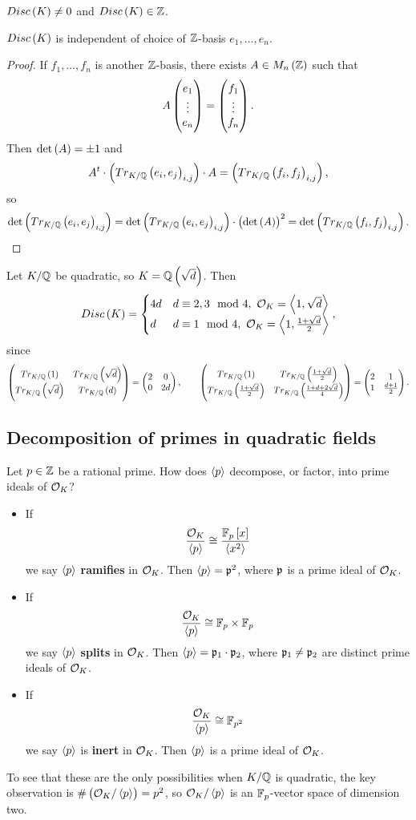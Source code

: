 \begin{remark*}
$ Disc\br{K} \ne 0 $ and $ Disc\br{K} \in \Z $.
\end{remark*}

\begin{lemma}
$ Disc\br{K} $ is independent of choice of $ \mathbb{Z} $-basis $ e_1, \dots, e_n $.
\end{lemma}

\begin{proof}
If $ f_1, \dots, f_n $ is another $ \mathbb{Z} $-basis, there exists $ A \in M_n\br{\Z} $ such that
$$ A\begin{pmatrix} e_1 \\ \vdots \\ e_n \end{pmatrix} = \begin{pmatrix} f_1 \\ \vdots \\ f_n \end{pmatrix}. $$
Then $ \det\br{A} = \pm 1 $ and
$$ A^t \cdot \br{Tr_{K / \Q}\br{e_i, e_j}_{i, j}} \cdot A = \br{Tr_{K / \Q}\br{f_i, f_j}_{i, j}}, $$
so
$$ \det\br{Tr_{K / \Q}\br{e_i, e_j}_{i, j}} = \det\br{Tr_{K / \Q}\br{e_i, e_j}_{i, j}} \cdot \br{\det\br{A}}^2 = \det\br{Tr_{K / \Q}\br{f_i, f_j}_{i, j}}. $$
\end{proof}

\pagebreak

\begin{example*}
Let $ K / \mathbb{Q} $ be quadratic, so $ K = \Q\br{\sqrt{d}} $. Then
$$ Disc\br{K} =
\begin{cases}
4d & d \equiv 2, 3 \mod 4, \ \OO_K = \abr{1, \sqrt{d}} \\
d & d \equiv 1 \mod 4, \ \OO_K = \abr{1, \tfrac{1 + \sqrt{d}}{2}}
\end{cases},
$$
since
$$ \twobytwo{Tr_{K / \Q}\br{1}}{Tr_{K / \Q}\br{\sqrt{d}}}{Tr_{K / \Q}\br{\sqrt{d}}}{Tr_{K / \Q}\br{d}} = \twobytwo{2}{0}{0}{2d}, \qquad \twobytwo{Tr_{K / \Q}\br{1}}{Tr_{K / \Q}\br{\tfrac{1 + \sqrt{d}}{2}}}{Tr_{K / \Q}\br{\tfrac{1 + \sqrt{d}}{2}}}{Tr_{K / \Q}\br{\tfrac{1 + d + 2\sqrt{d}}{4}}} = \twobytwo{2}{1}{1}{\tfrac{d + 1}{2}}. $$
\end{example*}

\subsection{Decomposition of primes in quadratic fields}

Let $ p \in \mathbb{Z} $ be a rational prime. How does $ \left\langle p \right\rangle $ decompose, or factor, into prime ideals of $ \mathcal{O}_K $?
\begin{itemize}
\item If
$$ \dfrac{\OO_K}{\abr{p}} \cong \dfrac{\F_p\sbr{x}}{\abr{x^2}} $$
we say $ \left\langle p \right\rangle $ \textbf{ramifies} in $ \mathcal{O}_K $. Then $ \left\langle p \right\rangle = \mathfrak{p}^2 $, where $ \mathfrak{p} $ is a prime ideal of $ \mathcal{O}_K $.
\item If
$$ \dfrac{\mathcal{O}_K}{\left\langle p \right\rangle} \cong \mathbb{F}_p \times \mathbb{F}_p $$
we say $ \left\langle p \right\rangle $ \textbf{splits} in $ \mathcal{O}_K $. Then $ \left\langle p \right\rangle = \mathfrak{p}_1 \cdot \mathfrak{p}_2 $, where $ \mathfrak{p}_1 \ne \mathfrak{p}_2 $ are distinct prime ideals of $ \mathcal{O}_K $.
\item If
$$ \dfrac{\mathcal{O}_K}{\left\langle p \right\rangle} \cong \mathbb{F}_{p^2} $$
we say $ \left\langle p \right\rangle $ is \textbf{inert} in $ \mathcal{O}_K $. Then $ \left\langle p \right\rangle $ is a prime ideal of $ \mathcal{O}_K $.
\end{itemize}
To see that these are the only possibilities when $ K / \mathbb{Q} $ is quadratic, the key observation is $ \#\br{\OO_K / \abr{p}} = p^2 $, so $ \mathcal{O}_K / \left\langle p \right\rangle $ is an $ \mathbb{F}_p $-vector space of dimension two.

